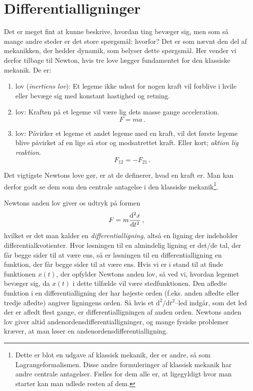 \section{Differentialligninger}
Det er meget fint at kunne beskrive, hvordan ting bevæger sig, men som så mange andre steder er det store spørgsmål: hvorfor?
Det er som nævnt den del af mekanikken, der hedder dynamik, som belyser dette spørgsmål. Her vender vi derfor tilbage til Newton, hvis tre love lægger fundamentet for den klassiske mekanik. 
De er:
\begin{enumerate}
    \item lov ({\em inertiens lov}): Et legeme ikke udsat for nogen kraft vil forblive i hvile eller bevæge sig med konstant hastighed og retning.
    \item lov: Kraften på et legeme vil være lig dets masse gange acceleration.
    \begin{equation} \label{mat:eq:N2}
        F=ma \, .
    \end{equation}
    \item lov: Påvirker et legeme et andet legeme med en kraft, vil det første legeme blive påvirket af en lige så stor og modsatrettet kraft. Eller kort; {\em aktion lig reaktion}.
    \begin{equation}
        F_{12}=-F_{21} \, .
    \end{equation}
\end{enumerate}
Det vigtigste Newtons love gør, er at de definerer, hvad en kraft er.
Man kan derfor godt se dem som den centrale antagelse i den klassiske mekanik\footnote{Dette er blot en udgave af klassisk mekanik, der er andre, så som Lagrangeformalismen. Disse andre formuleringer af klassisk mekanik har andre centrale antagelser. Fælles for dem alle er, at ligegyldigt hvor man starter kan man udlede resten af dem.}.

Newtons anden lov giver os udtryk på formen
\begin{equation}
    F=m\dv[2]{x}{t} \, ,
\end{equation}
hvilket er det man kalder en \emph{differentialligning}, altså en ligning der indeholder differentialkvotienter.
Hvor løsningen til en almindelig ligning er det/de tal, der får begge sider til at være ens, så er løsningen til en differentialligning en funktion, der får begge sider til at være ens.
Hvis vi er i stand til at finde funktionen $x(t)$, der opfylder Newtons anden lov, så ved vi, hvordan legemet bevæger sig, da $x(t)$ i dette tilfælde vil være stedfunktionen.
Den afledte funktion i en differentialligning der har højeste orden (f.eks. anden afledte eller tredje afledte) angiver ligningens orden. Så hvis et $\text{d}^2 / \text{d}t^2$--led indgår, som det led der er afledt flest gange, er differentialligningen af anden orden.
Newtons anden lov giver altid andenordensdifferentialligninger, og
mange fysiske problemer kræver, at man løser en andenordensdifferentialligning.

